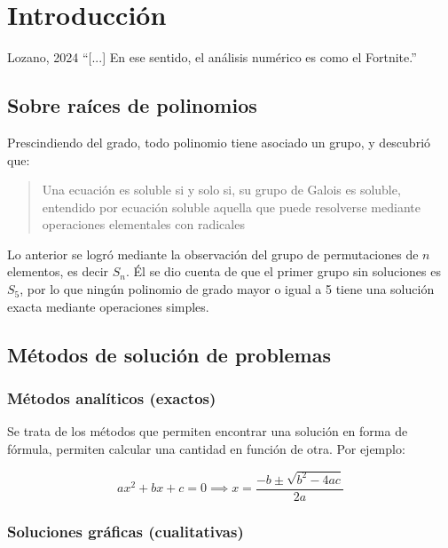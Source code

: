\chapter{Introducción}

\begin{chapquote}{Lozano, 2024}
    ``[...] En ese sentido, el análisis numérico es como el Fortnite.''
\end{chapquote}


\section{Sobre raíces de polinomios}

Prescindiendo del grado, todo polinomio tiene asociado un grupo, y
descubrió que:

\begin{quote}
    Una ecuación es soluble si y solo si, su grupo de Galois es soluble,
    entendido por ecuación soluble aquella que puede resolverse mediante
    operaciones elementales con radicales
\end{quote}

Lo anterior se logró mediante la observación del grupo de permutaciones
de \(n\) elementos, es decir \(S_n\). Él se dio cuenta de que el primer
grupo sin soluciones es \(S_5\), por lo que ningún polinomio de grado
mayor o igual a 5 tiene una solución exacta mediante operaciones
simples.

\section{Métodos de solución de problemas}

\subsection{Métodos analíticos (exactos)}

Se trata de los métodos que permiten encontrar una solución en forma de
fórmula, permiten calcular una cantidad en función de otra. Por ejemplo:

\begin{equation*}{
        ax^2 + bx + c = 0 \implies x = \frac{-b \pm \sqrt{b^2 -4ac}}{2a}
}\end{equation*}

\subsection{Soluciones gráficas (cualitativas)}

